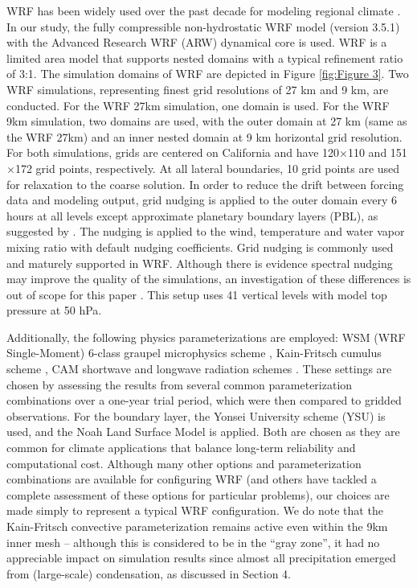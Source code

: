 \documentclass[ms,draft]{agutex}   %
\begin{document}
\begin{article}
WRF has been widely used over the past decade for modeling regional climate \citep{lo2008assessment, leung2009atmospheric, soares2012wrf, sun2015hybrid}. In our study, the fully compressible non-hydrostatic WRF model (version 3.5.1) with the Advanced Research WRF (ARW) dynamical core is used.  WRF is a limited area model that supports nested domains with a typical refinement ratio of 3:1.  The simulation domains of WRF are depicted in Figure \ref{fig:Figure 3}. Two WRF simulations, representing finest grid resolutions of 27 km and 9 km, are conducted.  For the WRF 27km simulation, one domain is used. For the WRF 9km simulation, two domains are used, with the outer domain at 27 km (same as the WRF 27km) and an inner nested domain at 9 km horizontal grid resolution. For both simulations,  grids are centered on California and have 120$\times$110 and 151$\times$172 grid points, respectively. At all lateral boundaries, 10 grid points are used for relaxation to the coarse solution. In order to reduce the drift between forcing data and modeling output, grid nudging \citep{stauffer1990use} is applied to the outer domain every 6 hours at all levels except approximate planetary boundary layers (PBL), as suggested by \cite{lo2008assessment}. The nudging is applied to the wind, temperature and water vapor mixing ratio with default nudging coefficients. Grid nudging is commonly used and maturely supported in WRF. Although there is evidence spectral nudging may improve the quality of the simulations, an investigation of these differences is out of scope for this paper \citep{liu2012differences}. This setup uses 41 vertical levels with model top pressure at 50 hPa.

Additionally, the following physics parameterizations are employed: WSM (WRF Single-Moment) 6-class graupel microphysics scheme \citep{hong2006wrf}, Kain-Fritsch cumulus scheme \citep{kain2004kain}, CAM shortwave and longwave radiation schemes \citep{collins2004description}.  These settings are chosen by assessing the results from several common parameterization combinations over a one-year trial period, which were then compared to gridded observations. For the boundary layer, the Yonsei University scheme (YSU) \citep{hong2006new} is used, and the Noah Land Surface Model \citep{chen2001coupling} is applied. Both are chosen as they are common for climate applications that balance long-term reliability and computational cost.  Although many other options and parameterization combinations are available for configuring WRF (and others have tackled a complete assessment of these options for particular problems), our choices are made simply to represent a typical WRF configuration. We do note that the Kain-Fritsch convective parameterization remains active even within the 9km inner mesh -- although this is considered to be in the ``gray zone'', it had no appreciable impact on  simulation results since almost all precipitation emerged from (large-scale) condensation, as discussed in Section 4.


\end{article}
\end{document}
